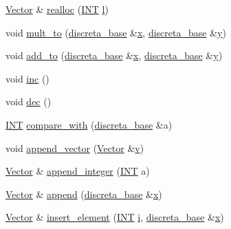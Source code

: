 \begin{DoxyCompactItemize}
\item 
\mbox{\hyperlink{class_vector}{Vector}} \& \mbox{\hyperlink{class_vector_a00aff28a4a7cacc8c5aaf44b6f3fb3a5}{realloc}} (\mbox{\hyperlink{galois_8h_a09fddde158a3a20bd2dcadb609de11dc}{I\+NT}} \mbox{\hyperlink{alphabet2_8_c_a89606eca6b563ec68d2da2e84657736f}{l}})
\item 
void \mbox{\hyperlink{class_vector_a77dd4ded54124a6f928c411dc0960a73}{mult\+\_\+to}} (\mbox{\hyperlink{classdiscreta__base}{discreta\+\_\+base}} \&\mbox{\hyperlink{alphabet2_8_c_a6150e0515f7202e2fb518f7206ed97dc}{x}}, \mbox{\hyperlink{classdiscreta__base}{discreta\+\_\+base}} \&\mbox{\hyperlink{alphabet2_8_c_a0a2f84ed7838f07779ae24c5a9086d33}{y}})
\item 
void \mbox{\hyperlink{class_vector_a3e170560de50e3a4f4a95f6b90bf75bb}{add\+\_\+to}} (\mbox{\hyperlink{classdiscreta__base}{discreta\+\_\+base}} \&\mbox{\hyperlink{alphabet2_8_c_a6150e0515f7202e2fb518f7206ed97dc}{x}}, \mbox{\hyperlink{classdiscreta__base}{discreta\+\_\+base}} \&\mbox{\hyperlink{alphabet2_8_c_a0a2f84ed7838f07779ae24c5a9086d33}{y}})
\item 
void \mbox{\hyperlink{class_vector_a5f6fe0531bc3d9829becd8503e4156a3}{inc}} ()
\item 
void \mbox{\hyperlink{class_vector_ac2c2f8a845000951b008bbe833be3fd4}{dec}} ()
\item 
\mbox{\hyperlink{galois_8h_a09fddde158a3a20bd2dcadb609de11dc}{I\+NT}} \mbox{\hyperlink{class_vector_a5fc27308a2710188b16f92df56c79c55}{compare\+\_\+with}} (\mbox{\hyperlink{classdiscreta__base}{discreta\+\_\+base}} \&a)
\item 
void \mbox{\hyperlink{class_vector_a8205e92d0db9cdb38411066a68c02eb0}{append\+\_\+vector}} (\mbox{\hyperlink{class_vector}{Vector}} \&\mbox{\hyperlink{simeon_8_c_aeb3f3030944801b163bc3b829a7f6710}{v}})
\item 
\mbox{\hyperlink{class_vector}{Vector}} \& \mbox{\hyperlink{class_vector_a8b77be10bea96a9bfa50f43726c942e5}{append\+\_\+integer}} (\mbox{\hyperlink{galois_8h_a09fddde158a3a20bd2dcadb609de11dc}{I\+NT}} a)
\item 
\mbox{\hyperlink{class_vector}{Vector}} \& \mbox{\hyperlink{class_vector_aec80be90cd2cbfe79267220113b679c4}{append}} (\mbox{\hyperlink{classdiscreta__base}{discreta\+\_\+base}} \&\mbox{\hyperlink{alphabet2_8_c_a6150e0515f7202e2fb518f7206ed97dc}{x}})
\item 
\mbox{\hyperlink{class_vector}{Vector}} \& \mbox{\hyperlink{class_vector_ad9e492806e8a030fef5ce8fbad81fdd8}{insert\+\_\+element}} (\mbox{\hyperlink{galois_8h_a09fddde158a3a20bd2dcadb609de11dc}{I\+NT}} \mbox{\hyperlink{alphabet2_8_c_acb559820d9ca11295b4500f179ef6392}{i}}, \mbox{\hyperlink{classdiscreta__base}{discreta\+\_\+base}} \&\mbox{\hyperlink{alphabet2_8_c_a6150e0515f7202e2fb518f7206ed97dc}{x}})

\end{DoxyCompactItemize}
